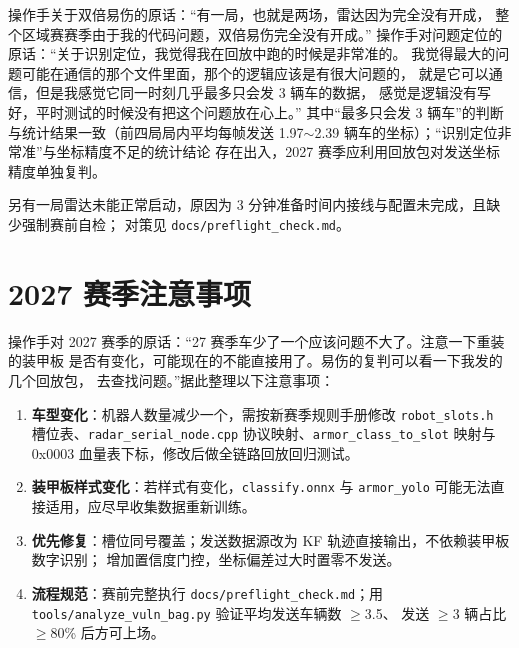 \documentclass[11pt,a4paper,fontset=none]{ctexart}
\newcommand{\code}[1]{\texttt{#1}}
\begin{document}
操作手关于双倍易伤的原话：``有一局，也就是两场，雷达因为完全没有开成，
整个区域赛赛季由于我的代码问题，双倍易伤完全没有开成。''
操作手对问题定位的原话：``关于识别定位，我觉得我在回放中跑的时候是非常准的。
我觉得最大的问题可能在通信的那个文件里面，那个的逻辑应该是有很大问题的，
就是它可以通信，但是我感觉它同一时刻几乎最多只会发 3 辆车的数据，
感觉是逻辑没有写好，平时测试的时候没有把这个问题放在心上。''
其中``最多只会发 3 辆车''的判断与统计结果一致（前四局局内平均每帧发送
1.97$\sim$2.39 辆车的坐标）；``识别定位非常准''与坐标精度不足的统计结论
存在出入，2027 赛季应利用回放包对发送坐标精度单独复判。

另有一局雷达未能正常启动，原因为 3 分钟准备时间内接线与配置未完成，且缺少强制赛前自检；
对策见 \code{docs/preflight\_check.md}。

\section{2027 赛季注意事项}

操作手对 2027 赛季的原话：``27 赛季车少了一个应该问题不大了。注意一下重装的装甲板
是否有变化，可能现在的不能直接用了。易伤的复判可以看一下我发的几个回放包，
去查找问题。''据此整理以下注意事项：

\begin{enumerate}
  \item \textbf{车型变化}：机器人数量减少一个，需按新赛季规则手册修改 \code{robot\_slots.h}
        槽位表、\code{radar\_serial\_node.cpp} 协议映射、\code{armor\_class\_to\_slot} 映射与
        0x0003 血量表下标，修改后做全链路回放回归测试。
  \item \textbf{装甲板样式变化}：若样式有变化，\code{classify.onnx} 与 \code{armor\_yolo}
        可能无法直接适用，应尽早收集数据重新训练。
  \item \textbf{优先修复}：槽位同号覆盖；发送数据源改为 KF 轨迹直接输出，不依赖装甲板数字识别；
        增加置信度门控，坐标偏差过大时置零不发送。
  \item \textbf{流程规范}：赛前完整执行 \code{docs/preflight\_check.md}；用
        \code{tools/analyze\_vuln\_bag.py} 验证平均发送车辆数 $\ge$3.5、
        发送 $\ge$3 辆占比 $\ge$80\% 后方可上场。
\end{enumerate}
\end{document}
